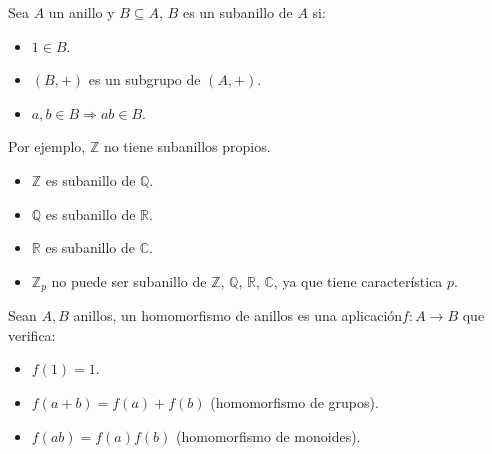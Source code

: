 
\begin{definicion}[Subanillo]
    Sea $A$ un anillo y $B\subseteq A$, $B$ es un subanillo de $A$ si:
    \begin{itemize}
        \item $1\in B$.
        \item $(B,+)$ es un subgrupo de $(A,+)$.
        \item $a,b\in B\Longrightarrow ab\in B$.
    \end{itemize}
\end{definicion}

\begin{ejemplo}
    Por ejemplo, $\mathbb{Z}$ no tiene subanillos propios.
    \begin{itemize}
        \item $\mathbb{Z}$ es subanillo de $\mathbb{Q}$.
        \item $\mathbb{Q}$ es subanillo de $\mathbb{R}$.
        \item $\mathbb{R}$ es subanillo de $\mathbb{C}$.
        \item $\mathbb{Z}_p$ no puede ser subanillo de $\mathbb{Z}$, $\mathbb{Q}$, $\mathbb{R}$, $\mathbb{C}$, ya que tiene característica $p$.
    \end{itemize}
\end{ejemplo}

\begin{definicion}
    Sean $A,B$ anillos, un homomorfismo de anillos es una aplicación$f:A\to B$ que verifica:
    \begin{itemize}
        \item $f(1) = 1$.
        \item $f(a+b) = f(a) + f(b)$ (homomorfismo de grupos).
        \item $f(ab) = f(a)f(b)$ (homomorfismo de monoides).
    \end{itemize}
\end{definicion}


